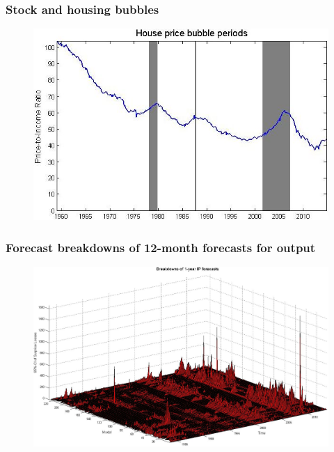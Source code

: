 \documentclass [handout] {beamer} %
\begin{document}
\begin{frame}
\frametitle{Stock and housing bubbles}
\begin{figure}[htb]
  \centering
    \includegraphics[width=\textwidth]{housebubble.jpg}
\end{figure}
\end{frame}

\begin{frame}
\frametitle{Forecast breakdowns of 12-month forecasts for output}
\begin{figure}[htb]
  \centering
    \includegraphics[width=\textwidth]{breakdowns.jpg}
\end{figure}
\end{frame}
		
\appendix
{}
\setcounter{finalframe}{\value{framenumber}}
	
\newcommand{\LastPageText}{Thank you.}
\begin{frame}[plain]
	\lastpage
\end{frame}

\begin{frame}[allowframebreaks]
\begin{small}

\end{small}
\end{frame}
%		

	
\end{document}
